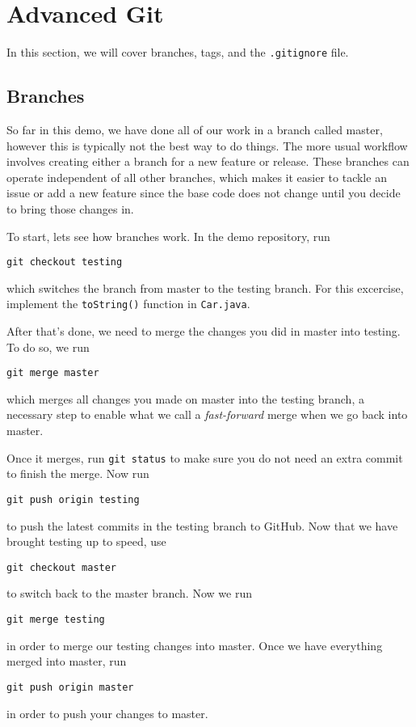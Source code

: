 \documentclass[notitlepage]{simple}
\begin{document}
\section{Advanced Git}

In this section, we will cover branches, tags, and the \verb|.gitignore| file.

\subsection{Branches}

So far in this demo, we have done all of our work in a branch called master, however this is typically not the best way to do things.
The more usual workflow involves creating either a branch for a new feature or release.
These branches can operate independent of all other branches, which makes it easier to tackle an issue or add a new feature since the base code does not change until you decide to bring those changes in.

To start, lets see how branches work.
In the demo repository, run
\begin{terminal}
	\verb|git checkout testing|
\end{terminal}
which switches the branch from master to the testing branch.
For this excercise, implement the \verb|toString()| function in \verb|Car.java|.

After that's done, we need to merge the changes you did in master into testing.
To do so, we run
\begin{terminal}
	\verb|git merge master|
\end{terminal}
which merges all changes you made on master into the testing branch, a necessary step to enable what we call a \textit{fast-forward} merge when we go back into master.

Once it merges, run \verb|git status| to make sure you do not need an extra commit to finish the merge.
Now run
\begin{terminal}
	\verb|git push origin testing|
\end{terminal}
to push the latest commits in the testing branch to GitHub.
Now that we have brought testing up to speed, use
\begin{terminal}
	\verb|git checkout master|
\end{terminal}
to switch back to the master branch.
Now we run
\begin{terminal}
	\verb|git merge testing|
\end{terminal}
in order to merge our testing changes into master.
Once we have everything merged into master, run
\begin{terminal}
	\verb|git push origin master|
\end{terminal}
in order to push your changes to master.
\end{document}
